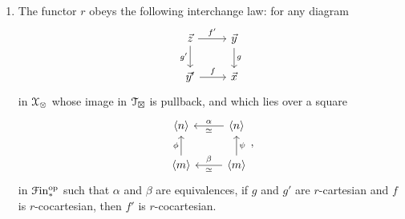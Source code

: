 \documentclass[main.tex]{subfiles}
\begin{document}
\begin{lemma}
\begin{enumerate}
\begin{enumerate}
        \item The functor $r$ obeys the following interchange law: for any diagram
          \begin{equation}
            \label{eq:diagram_in_total_space_interchange_law}
            \begin{tikzcd}
              \vec{z}
              \arrow[r, "f'"]
              \arrow[d, swap, "g'"]
              & \vec{y}
              \arrow[d, "g"]
              \\
              \vec{y}'
              \arrow[r, "f"]
              & \vec{x}
            \end{tikzcd}
          \end{equation}
          in $\mathcal{X}_{\otimes}$ whose image in $\mathcal{T}_{\boxtimes}$ is pullback, and which lies over a square
          \begin{equation}
            \label{eq:diagram_in_base_space_interchange_law}
            \begin{tikzcd}
              \langle n \rangle
              & \langle n \rangle
              \arrow[l, "\alpha"{above}, "\simeq"{below}]
              \\
              \langle m \rangle
              \arrow[u, "\phi"]
              & \langle m \rangle
              \arrow[l, "\beta"{above}, "\simeq"{below}]
              \arrow[u, swap, "\psi"]
            \end{tikzcd},
          \end{equation}
          in $\mathcal{F}\mathrm{in}_{*}^{\mathrm{op}}$ such that $\alpha$ and $\beta$ are equivalences, if $g$ and $g'$ are $r$-cartesian and $f$ is $r$-cocartesian, then $f'$ is $r$-cocartesian.
      \end{enumerate}
  \end{enumerate}
\end{lemma}
\end{document}
